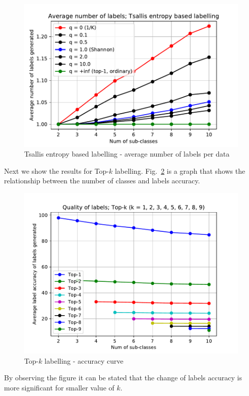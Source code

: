 \documentclass[a4paper,conference]{IEEEtran}
\begin{document}
\begin{figure}[t]
\begin{center}
    \includegraphics[width=1.0\linewidth]{figs/graphs/tsallis-qs-lnum.pdf}
    \caption{Tsallis entropy based labelling - average number of labels per data}
    \label{fig:tsallis_ave_lnum}
\end{center}
\end{figure}

Next we show the results for Top-$k$ labelling.
Fig.~\ref{fig:top-k} is a graph that shows the relationship between the number of classes and labels accuracy.

\begin{figure}[t]
\begin{center}
    \includegraphics[width=1.0\linewidth]{figs/graphs/topk-labels-acc.pdf}
    \caption{Top-$k$ labelling - accuracy curve}
    \label{fig:top-k}
\end{center}
\end{figure}
By observing the figure it can be stated that the change of labels accuracy is more significant for smaller value of $k$.
\end{document}
